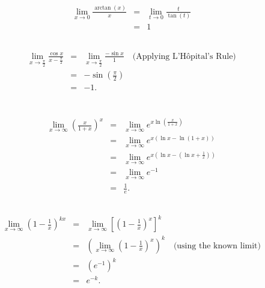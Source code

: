 \documentclass{article}
\begin{document}
						\subsection{}
\[
\begin{array}{rcl}
	\lim_{x \to 0} \frac{\arctan(x)}{x} 
	& = & \lim_{t \to 0} \frac{t}{\tan(t)} \\
	& = & 1
\end{array}
\]
						\subsection{}
\[
\begin{array}{rcl}
	\lim_{x \to \frac{\pi}{2}} \frac{\cos x}{x - \frac{\pi}{2}} 
	& = & \lim_{x \to \frac{\pi}{2}} \frac{-\sin x}{1} \quad \text{(Applying L'Hôpital's Rule)} \\
	& = & -\sin\left(\frac{\pi}{2}\right) \\
	& = & -1.
\end{array}
\]
					\section{}

						\subsection{}

\[
\begin{array}{rcl}
	\lim_{x \to \infty} \left( \frac{x}{1+x} \right)^x 
	& = & \lim_{x \to \infty} e^{x \ln\left( \frac{x}{1+x} \right)} \\
	& = & \lim_{x \to \infty} e^{x \left( \ln x - \ln(1+x) \right)} \\
	& = & \lim_{x \to \infty} e^{x \left( \ln x - \left( \ln x + \frac{1}{x} \right) \right)} \\
	& = & \lim_{x \to \infty} e^{-1} \\
	& = & \frac{1}{e}.
\end{array}
\]


						\subsection{}
\[
\begin{array}{rcl}
	\lim_{x \to \infty} \left(1 - \frac{1}{x} \right)^{kx} 
	& = & \lim_{x \to \infty} \left[\left(1 - \frac{1}{x}\right)^{x}\right]^k \\
	& = & \left(\lim_{x \to \infty} \left(1 - \frac{1}{x}\right)^{x}\right)^{k} \quad \text{(using the known limit)} \\
	& = & (e^{-1})^{k} \\
	& = & e^{-k}.
\end{array}
\]
\end{document}
